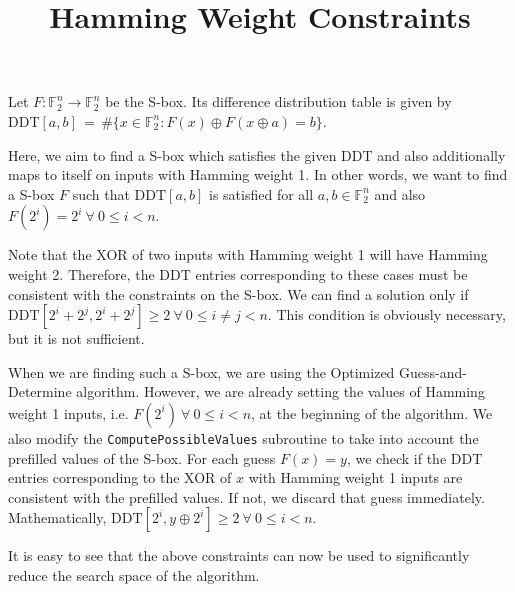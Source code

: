 \documentclass{article}
\title{Hamming Weight Constraints}
\author{}
\date{}
\begin{document}
\maketitle

Let $F:\mathbb{F}_2^n \to \mathbb{F}_2^n$ be the S-box. Its difference distribution table is given by $\mathrm{DDT}[a,b] \,=\, \#\{x\in\mathbb{F}_2^n : F(x)\oplus F(x\oplus a)=b\}$.

Here, we aim to find a S-box which satisfies the given DDT and also additionally maps to itself on inputs with Hamming weight 1. In other words, we want to find a S-box $F$ such that $\mathrm{DDT}[a,b]$ is satisfied for all $a,b\in\mathbb{F}_2^n$ and also $F(2^i) = 2^i \ \forall \ 0 \leq i < n$.

Note that the XOR of two inputs with Hamming weight 1 will have Hamming weight 2. Therefore, the DDT entries corresponding to these cases must be consistent with the constraints on the S-box. We can find a solution only if $\mathrm{DDT}[2^i + 2^j, 2^i + 2^j] \geq 2 \ \forall \ 0 \leq i \neq j < n$. This condition is obviously necessary, but it is not sufficient.

When we are finding such a S-box, we are using the Optimized Guess-and-Determine algorithm. However, we are already setting the values of Hamming weight 1 inputs, i.e. $F(2^i) \ \forall \ 0 \leq i < n$, at the beginning of the algorithm. We also modify the \texttt{ComputePossibleValues} subroutine to take into account the prefilled values of the S-box. For each guess $F(x) = y$, we check if the DDT entries corresponding to the XOR of $x$ with Hamming weight 1 inputs are consistent with the prefilled values. If not, we discard that guess immediately. Mathematically, $\mathrm{DDT}[2^i, y \oplus 2^i] \geq 2 \ \forall \ 0 \leq i < n$.

It is easy to see that the above constraints can now be used to significantly reduce the search space of the algorithm.
\end{document}
